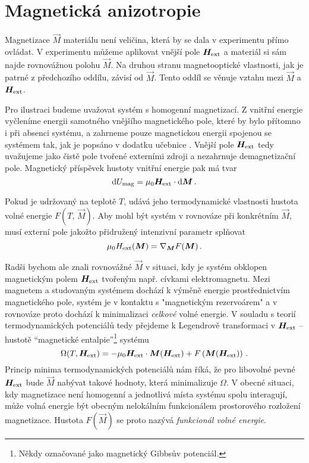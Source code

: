 \section{Magnetická anizotropie}
\label{chap:magneticka-anizotropie}

Magnetizace $\vec{M}$ materiálu není veličina, která by se dala v experimentu přímo ovládat.
V experimentu můžeme aplikovat vnější pole $\bm{H}_\textrm{ext}$ a materiál si sám najde rovnovážnou polohu $\vec{M}$.
Na druhou stranu magnetooptické vlastnosti, jak je patrné z předchozího oddílu, závisí od $\vec{M}$.
Tento oddíl se věnuje vztahu mezi $\vec{M}$ a $\bm{H}_\textrm{ext}$.

Pro ilustraci budeme uvažovat systém s homogenní magnetizací.
Z vnitřní energie vyčleníme energii samotného vnějšího magnetického pole, které by bylo přítomno i při absenci systému, a zahrneme pouze magnetickou energii spojenou se systémem tak, jak je popsáno v dodatku učebnice \cite{callenThermodynamicsIntroductionThermostatistics1985}.
Vnější pole $\bm{H}_\textrm{ext}$ tedy uvažujeme jako čistě pole tvořené externími zdroji a nezahrnuje demagnetizační pole.
Magnetický příspěvek hustoty vnitřní energie pak má tvar\cite{callenThermodynamicsIntroductionThermostatistics1985} 
\begin{equation}
        \textrm{d} U_\textrm{mag} = \mu_0 \bm{H}_\textrm{ext} \cdot \textrm{d}\bm{M}\,.
\end{equation}

Pokud je udržovaný na teplotě $T$, udává jeho termodynamické vlastnosti hustota volné energie $F(T,\,\vec{M})$\cite{callenThermodynamicsIntroductionThermostatistics1985}.
Aby mohl být systém v rovnováze při konkrétním $\vec{M}$, musí externí pole jakožto přidružený intenzivní parametr splňovat
\begin{equation} 
\label{eqn:Hext=gradF}
    \mu_0H_\textrm{ext}(\bm{M}) = \nabla_{\bm{M}} F(\bm{M}) \,.
\end{equation}

Radši bychom ale znali rovnovážné $\vec{M}$ v situaci, kdy je systém obklopen magnetickým polem $\bm{H}_\textrm{ext}$ tvořeným např. cívkami elektromagnetu.
Mezi magnetem a studovaným systémem dochází k výměně energie prostřednictvím magnetického pole, systém je v kontaktu s "magnetickým rezervoárem" a v rovnováze proto dochází k minimalizaci \emph{celkové} volné energie.
V souladu s teorií termodynamických potenciálů tedy přejdeme k Legendrově transformaci v $\bm{H}_\textrm{ext}$ -- hustotě ``magnetické entalpie''\footnote{Někdy označované jako magnetický Gibbsův potenciál.} systému\cite{castellanoThermodynamicPotentialsSimple2003}
\begin{equation} 
\label{eqn:magneticka-entalpie}
    \Omega(T,\bm{H}_\textrm{ext})= -\mu_0\bm{H}_\textrm{ext}\cdot\bm{M}(\bm{H}_\textrm{ext})+F\left(\bm{M}(\bm{H}_\textrm{ext})\right) \,.
\end{equation}
Princip minima termodynamických potenciálů nám říká, že pro libovolné pevné $\bm{H}_\textrm{ext}$ bude $\vec{M}$ nabývat takové hodnoty, která minimalizuje $\Omega$.
V obecné situaci, kdy magnetizace není homogenní a jednotlivá místa systému spolu interagují, může volná energie být obecným nelokálním funkcionálem prostorového rozložení magnetizace.
Hustota $F(\vec{M})$ se proto nazývá \emph{funkcionál volné energie}.

